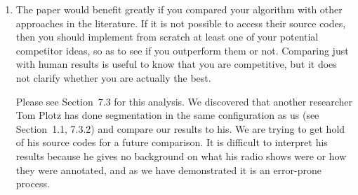 \documentclass[12pt,a4paper,twoside,final,onecolumn]{article}
\begin{document}
\begin{enumerate}
\item The paper would benefit greatly if you compared your algorithm with other approaches in the literature. If it is not possible to access their source codes, then you should implement from scratch at least one of your potential competitor ideas, so as to see if you outperform them or not. Comparing just with human results is useful to know that you are competitive, but it does not clarify whether you are actually the best.

{\color{blue}
Please see Section~7.3 for this analysis. We discovered that another researcher Tom Plotz has done segmentation in the same configuration as us (see Section~1.1, 7.3.2) and compare our results to his. We are trying to get hold of his source codes for a future comparison. It is difficult to interpret his results because he gives no background on what his radio shows were or how they were annotated, and as we have demonstrated it is an error-prone process.
}
\end{enumerate}
	
	
	
\end{document}
